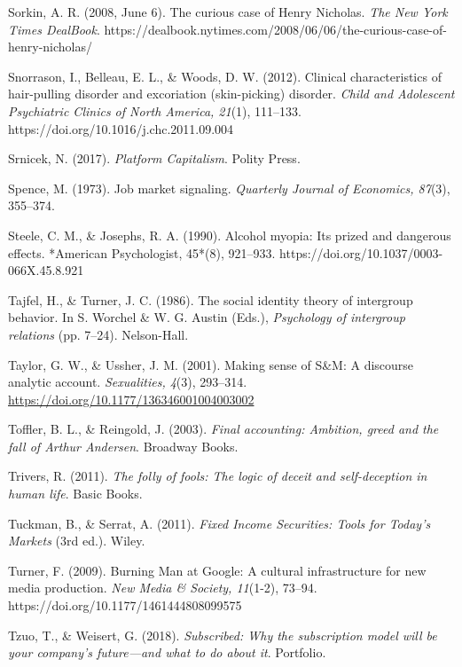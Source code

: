 \begin{thebibliography}{}
    Sorkin, A. R. (2008, June 6). The curious case of Henry Nicholas. \textit{The New York Times DealBook}. https://dealbook.nytimes.com/2008/06/06/the-curious-case-of-henry-nicholas/

    Snorrason, I., Belleau, E. L., \& Woods, D. W. (2012). Clinical characteristics of hair-pulling disorder and excoriation (skin-picking) disorder. \textit{Child and Adolescent Psychiatric Clinics of North America, 21}(1), 111–133. https://doi.org/10.1016/j.chc.2011.09.004

    Srnicek, N. (2017). \textit{Platform Capitalism}. Polity Press.

    Spence, M. (1973). Job market signaling. \textit{Quarterly Journal of Economics, 87}(3), 355–374.

    Steele, C. M., \& Josephs, R. A. (1990). Alcohol myopia: Its prized and dangerous effects. *American Psychologist, 45*(8), 921–933. https://doi.org/10.1037/0003-066X.45.8.921

    
    Tajfel, H., \& Turner, J. C. (1986). The social identity theory of intergroup behavior. In S. Worchel \& W. G. Austin (Eds.), \textit{Psychology of intergroup relations} (pp. 7–24). Nelson-Hall.

    Taylor, G. W., \& Ussher, J. M. (2001). Making sense of S\&M: A discourse analytic account. \textit{Sexualities, 4}(3), 293--314. \url{https://doi.org/10.1177/136346001004003002}

    Toffler, B. L., \& Reingold, J. (2003). \textit{Final accounting: Ambition, greed and the fall of Arthur Andersen}. Broadway Books.

    Trivers, R. (2011). \textit{The folly of fools: The logic of deceit and self-deception in human life}. Basic Books.

    Tuckman, B., \& Serrat, A. (2011). \textit{Fixed Income Securities: Tools for Today's Markets} (3rd ed.). Wiley.

    Turner, F. (2009). Burning Man at Google: A cultural infrastructure for new media production. \textit{New Media \& Society, 11}(1-2), 73–94. https://doi.org/10.1177/1461444808099575

    Tzuo, T., \& Weisert, G. (2018). \textit{Subscribed: Why the subscription model will be your company's future—and what to do about it}. Portfolio.


\end{thebibliography}
